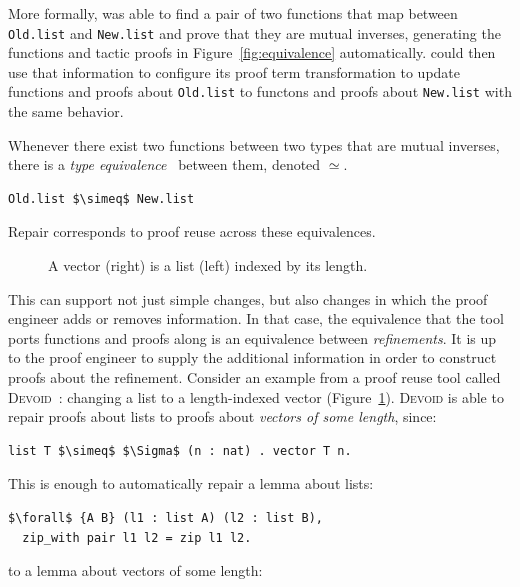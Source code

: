 More formally, \toolname was able to find a pair of two functions that map between \lstinline{Old.list}
and \lstinline{New.list} and prove that they are mutual inverses, generating the functions and tactic
proofs in Figure~\ref{fig:equivalence} automatically.
\toolname could then use that information to configure its proof term transformation to update
functions and proofs about \lstinline{Old.list} to functons and proofs about \lstinline{New.list} with
the same behavior.

Whenever there exist two functions between two types that are mutual inverses,
there is a \textit{type equivalence}~\cite{univalent2013homotopy} between them, denoted $\simeq$.

\begin{lstlisting}
Old.list $\simeq$ New.list
\end{lstlisting}
Repair corresponds to proof reuse across these equivalences.

\begin{figure}
\begin{minipage}{0.40\textwidth}
   
\end{minipage}
\hfill
\begin{minipage}{0.58\textwidth}
   
\end{minipage}
\caption{A vector (right) is a list (left) indexed by its length.}
\label{fig:listtovect}
\end{figure}

This can support not just simple changes, but also changes in which the proof engineer adds or removes information.
In that case, the equivalence that the tool ports functions and proofs along
is an equivalence between \textit{refinements}.
It is up to the proof engineer to supply the additional information in order to construct proofs about the refinement.
Consider an example from a proof reuse tool called \textsc{Devoid}~\cite{Ringer2019}:
changing a list to a length-indexed vector (Figure~\ref{fig:listtovect}).
\textsc{Devoid} is able to repair proofs about lists to proofs about \textit{vectors of some length}, since:

\begin{lstlisting}
list T $\simeq$ $\Sigma$ (n : nat) . vector T n.
\end{lstlisting}
This is enough to automatically repair a lemma about lists:

\begin{lstlisting}
$\forall$ {A B} (l1 : list A) (l2 : list B),
  zip_with pair l1 l2 = zip l1 l2.
\end{lstlisting}
to a lemma about vectors of some length:

